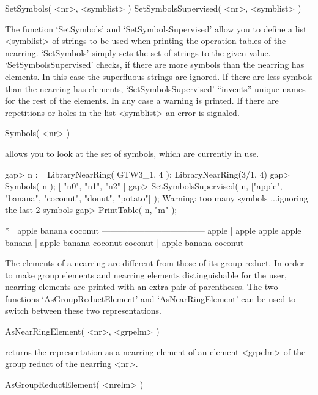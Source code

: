 

\>SetSymbols( <nr>, <symblist> )
\>SetSymbolsSupervised( <nr>, <symblist> )

The function `SetSymbols' and `SetSymbolsSupervised' allow you to define a
list <symblist> of strings to be used when printing the operation tables of
the nearring. `SetSymbols' simply sets the set of strings to the given value.
`SetSymbolsSupervised' checks, if there are more symbols than the nearring has
elements. In this case the superfluous strings are ignored. If there are less
symbols than the nearring has elements, `SetSymbolsSupervised' ``invents''
unique names for the rest of the elements. In any case a warning is printed.
If there are repetitions or holes in the list <symblist> an error is signaled.

\>Symbols( <nr> )

allows you to look at the set of symbols, which are currently in use.

\beginexample
    gap> n := LibraryNearRing( GTW3_1, 4 );
    LibraryNearRing(3/1, 4)
    gap> Symbols( n );
    [ "n0", "n1", "n2" ]
    gap> SetSymbolsSupervised( n,
            ["apple", "banana", "coconut", "donut", "potato"] );
    Warning: too many symbols ...ignoring the last 2 symbols
    gap> PrintTable( n, "m" );

            *  | apple    banana   coconut  
      ------------------------------------
      apple    | apple    apple    apple    
      banana   | apple    banana   coconut  
      coconut  | apple    banana   coconut  
\endexample



The elements of a nearring are different from those of its group reduct.
In order to make group elements and nearring elements distinguishable for the
user, nearring elements are printed with an extra pair of parentheses.
The two functions `AsGroupReductElement' and `AsNearRingElement' can be
used to switch between these two representations.

\>AsNearRingElement( <nr>, <grpelm> )

returns the representation as a nearring element of an element <grpelm> of the
group reduct of the nearring <nr>.

\>AsGroupReductElement( <nrelm> )

